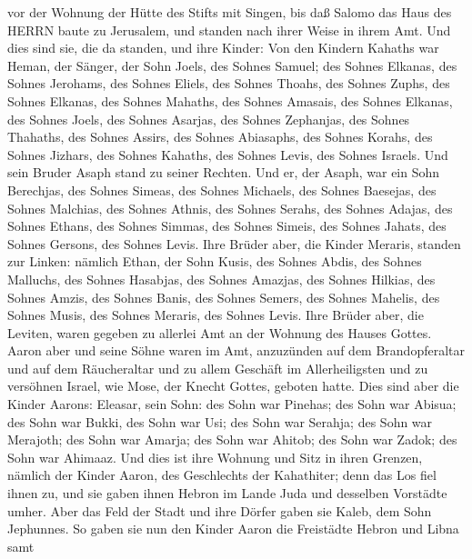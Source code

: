 vor der Wohnung der Hütte des Stifts mit Singen, bis daß Salomo das Haus
des HERRN baute zu Jerusalem, und standen nach ihrer Weise in ihrem Amt.
 Und dies sind sie, die da standen, und ihre Kinder: Von
den Kindern Kahaths war Heman, der Sänger, der Sohn Joels, des Sohnes
Samuel;  des Sohnes Elkanas, des Sohnes Jerohams, des
Sohnes Eliels, des Sohnes Thoahs,  des Sohnes Zuphs, des
Sohnes Elkanas, des Sohnes Mahaths, des Sohnes Amasais, 
des Sohnes Elkanas, des Sohnes Joels, des Sohnes Asarjas, des Sohnes
Zephanjas,  des Sohnes Thahaths, des Sohnes Assirs, des
Sohnes Abiasaphs, des Sohnes Korahs,  des Sohnes Jizhars,
des Sohnes Kahaths, des Sohnes Levis, des Sohnes Israels. 
Und sein Bruder Asaph stand zu seiner Rechten. Und er, der Asaph, war
ein Sohn Berechjas, des Sohnes Simeas,  des Sohnes
Michaels, des Sohnes Baesejas, des Sohnes Malchias,  des
Sohnes Athnis, des Sohnes Serahs, des Sohnes Adajas,  des
Sohnes Ethans, des Sohnes Simmas, des Sohnes Simeis,  des
Sohnes Jahats, des Sohnes Gersons, des Sohnes Levis.  Ihre
Brüder aber, die Kinder Meraris, standen zur Linken: nämlich Ethan, der
Sohn Kusis, des Sohnes Abdis, des Sohnes Malluchs,  des
Sohnes Hasabjas, des Sohnes Amazjas, des Sohnes Hilkias, 
des Sohnes Amzis, des Sohnes Banis, des Sohnes Semers,  des
Sohnes Mahelis, des Sohnes Musis, des Sohnes Meraris, des Sohnes Levis.
 Ihre Brüder aber, die Leviten, waren gegeben zu allerlei
Amt an der Wohnung des Hauses Gottes.  Aaron aber und seine
Söhne waren im Amt, anzuzünden auf dem Brandopferaltar und auf dem
Räucheraltar und zu allem Geschäft im Allerheiligsten und zu versöhnen
Israel, wie Mose, der Knecht Gottes, geboten hatte.  Dies
sind aber die Kinder Aarons: Eleasar, sein Sohn: des Sohn war Pinehas;
des Sohn war Abisua;  des Sohn war Bukki, des Sohn war Usi;
des Sohn war Serahja;  des Sohn war Merajoth; des Sohn war
Amarja; des Sohn war Ahitob;  des Sohn war Zadok; des Sohn
war Ahimaaz.  Und dies ist ihre Wohnung und Sitz in ihren
Grenzen, nämlich der Kinder Aaron, des Geschlechts der Kahathiter; denn
das Los fiel ihnen zu,  und sie gaben ihnen Hebron im Lande
Juda und desselben Vorstädte umher.  Aber das Feld der
Stadt und ihre Dörfer gaben sie Kaleb, dem Sohn Jephunnes. 
So gaben sie nun den Kinder Aaron die Freistädte Hebron und Libna samt
